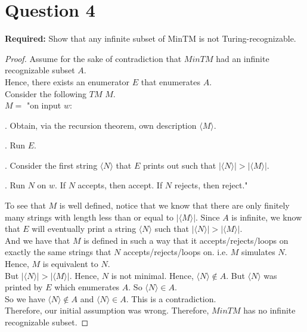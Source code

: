 \documentclass[12pt]{article}
\begin{document}
\newpage

\section*{Question 4}

\textbf{Required:} Show that any infinite subset of MinTM is not Turing-recognizable. \\

\begin{proof}
Assume for the sake of contradiction that $MinTM$ had an infinite recognizable subset $A$. \\

Hence, there exists an enumerator $E$ that enumerates $A$.  \\

Consider the following $TM$ $M$. \\

$M = $ "on input $w$: \\

\setlength\parindent{15pt}

. Obtain, via the recursion theorem, own description $\langle M \rangle$. 

. Run $E$. 

. Consider the first string $\langle N \rangle$ that $E$ prints out such that $|\langle N \rangle| > |\langle M \rangle|$. 

. Run $N$ on $w$. If $N$ accepts, then accept. If $N$ rejects, then reject." \\

\setlength\parindent{0pt}

To see that $M$ is well defined, notice that we know that there are only finitely many strings with length less than or equal to $|\langle M \rangle|$. Since $A$ is infinite, we know that $E$ will eventually print a string $\langle N \rangle$ such that $|\langle N \rangle| > |\langle M \rangle|$. \\

And we have that $M$ is defined in such a way that it accepts/rejects/loops on exactly the same strings that $N$ accepts/rejects/loops on. i.e. $M$ simulates $N$. Hence, $M$ is equivalent to $N$. \\

But $|\langle N \rangle| > |\langle M \rangle|$. Hence, $N$ is not minimal. Hence, $\langle N \rangle \not \in A$. But $\langle N \rangle$ was printed by $E$ which enumerates $A$. So $\langle N \rangle \in A$. \\

So we have $\langle N \rangle \not \in A$ and $\langle N \rangle \in A$. This is a contradiction. \\

Therefore, our initial assumption was wrong. Therefore, $MinTM$ has no infinite recognizable subset. 
 
\end{proof}
\end{document}
